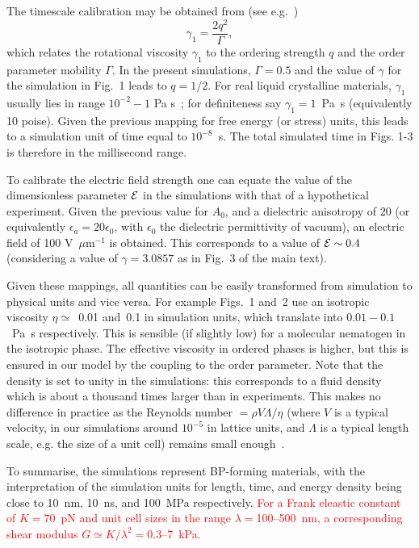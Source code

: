 \documentclass[12pt,twoside]{article}
\begin{document}
The timescale calibration may be obtained from (see e.g.~\cite{denniston})
\begin{equation}
\gamma_1=\frac{2q^2}{\Gamma},
\end{equation}
which relates the rotational viscosity $\gamma_1$ to the ordering strength
$q$ and the order parameter mobility $\Gamma$.
In the present simulations, $\Gamma = 0.5$ and the value of $\gamma$
for the simulation in Fig.~1 leads to $q=1/2$.   
For real liquid crystalline materials, $\gamma_1$ usually lies in range
$10^{-2}-1$ Pa s~\cite{deGennes}; for definiteness say
$\gamma_1 = 1$~Pa~s (equivalently 10 poise). Given the previous mapping for
free energy (or stress) units, this leads to a simulation unit of time equal
to $10^{-8}$~s. The total simulated time in Figs. 1-3 is therefore in the
millisecond range. 

To calibrate the electric field strength 
one can equate the value of the dimensionless parameter ${\cal E}$ in the 
simulations with that of a hypothetical experiment.
Given the previous value for $A_0$, and a dielectric anisotropy of 20
(or equivalently $\epsilon_a=20\epsilon_0$, with $\epsilon_0$ the
dielectric permittivity of vacuum), an electric field
of 100 V~$\mu$m$^{-1}$ is obtained. This corresponds to a value of
${\cal E}\sim 0.4$ (considering a value of $\gamma=3.0857$ as in
Fig.~3 of the main text).

Given these mappings, all quantities can be easily transformed from
simulation to physical units and vice versa. For example Figs.~1 and~2
use an isotropic viscosity $\eta \simeq$~0.01 and~0.1 in simulation units,
which translate into $0.01-0.1$~Pa~s respectively. This is sensible (if 
slightly low) for a molecular nematogen in the isotropic phase. 
The effective viscosity in ordered phases is higher, but this is ensured
in our model by the coupling to the order parameter.
Note that the density is set to unity in the simulations: this
corresponds to a fluid density which is about a thousand times larger
than in experiments. This makes no difference in practice as
the Reynolds number $= \rho V\Lambda/\eta$ (where $V$ is a typical
velocity, in our simulations around $10^{-5}$ in lattice units, 
and $\Lambda$ is a typical length scale, e.g. the size of a unit cell) 
remains small enough~\cite{codef}. 

To summarise, the simulations represent BP-forming materials, with the
interpretation of the simulation units for length, time, and energy
density being close to 10~nm, 10~ns, and 100~MPa respectively.
\textcolor{red}{For a Frank eleastic
constant of $K = 70$~pN and unit cell sizes in the range
$\lambda =$100--500~nm, a corresponding shear modulus $G \simeq
K/\lambda^2 =$0.3--7~kPa.}
\end{document}
